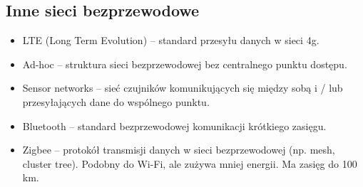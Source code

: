 \subsection{Inne sieci bezprzewodowe}
\begin{itemize}
	\item LTE (Long Term Evolution) -- standard przesyłu danych w sieci 4g.
	\item Ad-hoc -- struktura sieci bezprzewodowej bez centralnego punktu dostępu.
	\item Sensor networks -- sieć czujników komunikujących się między sobą i / lub przesyłających dane do wspólnego punktu.
	\item Bluetooth -- standard bezprzewodowej komunikacji krótkiego zasięgu.
	\item Zigbee -- protokół transmisji danych w sieci bezprzewodowej (np. mesh, cluster tree). Podobny do Wi-Fi, ale zużywa mniej energii. Ma zasięg do 100 km.
\end{itemize}
